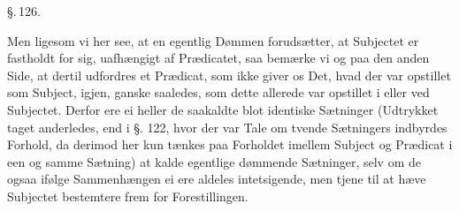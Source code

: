 \documentclass[12pt]{book}
\def\textit#1{#1}%
\def\emph#1{#1}%
\newcommand{\parag}[1]{%
  \par\vspace{0.9\baselineskip}%
  {\centering\textit{\S.\,#1.}\par}%
  \vspace{0.35\baselineskip}%
  \noindent\hspace{\parindent}\ignorespaces
}
\begin{document}
\parag{126}

Men ligesom vi her see, at en egentlig Dømmen forudsætter, at Subjectet er
fastholdt for sig, uafhængigt af Prædicatet, saa bemærke vi og paa den anden
Side, at dertil udfordres et Prædicat, som ikke giver os Det, hvad der var
opstillet som Subject, igjen, ganske saaledes, som dette allerede var opstillet i
eller ved Subjectet. Derfor ere ei heller de saakaldte blot \emph{identiske
Sætninger} (Udtrykket taget anderledes, end i §. 122, hvor der var Tale om tvende
Sætningers indbyrdes Forhold, da derimod her kun tænkes paa Forholdet imellem
Subject og Prædicat i een og samme Sætning) at kalde egentlige dømmende
Sætninger, selv om de ogsaa ifølge Sammenhængen ei ere aldeles intetsigende, men
tjene til at hæve Subjectet bestemtere frem for Forestillingen.
\end{document}
